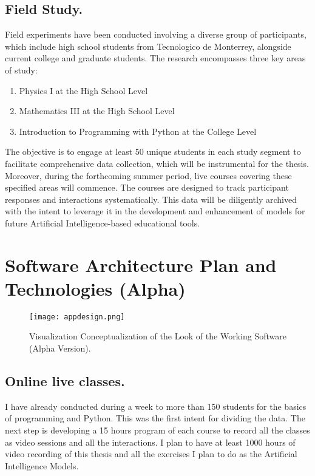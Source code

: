\subsection{Field Study.}

Field experiments have been conducted involving a diverse group of participants, which include high school students from Tecnologico de Monterrey, alongside current college and graduate students. The research encompasses three key areas of study:

\begin{enumerate}
    \item Physics I at the High School Level
    \item Mathematics III at the High School Level
    \item Introduction to Programming with Python at the College Level
\end{enumerate}

The objective is to engage at least 50 unique students in each study segment to facilitate comprehensive data collection, which will be instrumental for the thesis. Moreover, during the forthcoming summer period, live courses covering these specified areas will commence. The courses are designed to track participant responses and interactions systematically. This data will be diligently archived with the intent to leverage it in the development and enhancement of models for future Artificial Intelligence-based educational tools.


\section{Software Architecture Plan and Technologies (Alpha)}
\begin{figure}[H]
    \centering
    \texttt{[image: appdesign.png]}
    \caption{Visualization Conceptualization of the Look of the Working Software (Alpha Version).}
    \label{fig:my_label}
\end{figure}






\subsection{Online live classes.}
I have already conducted during a week to more than 150 students for the basics of programming and Python. This was the first intent for dividing the data. The next step is developing a 15 hours program of each course to record all the classes as video sessions and all the interactions.
I plan to have at least 1000 hours of video recording of this thesis and all the exercises I plan to do as the Artificial Intelligence Models.






